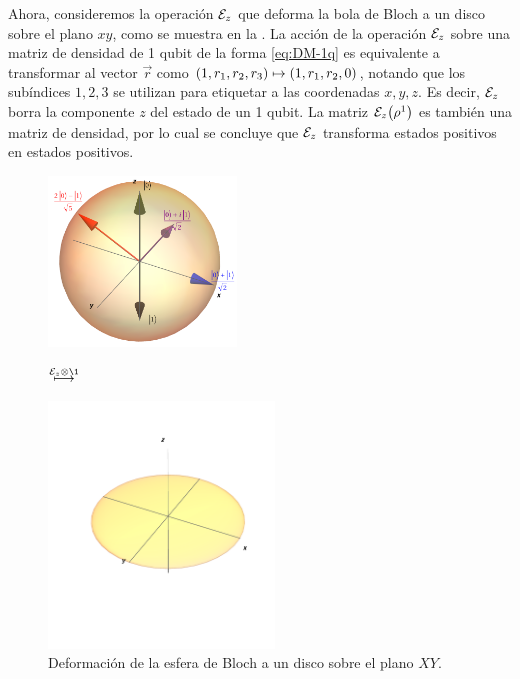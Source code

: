 Ahora, consideremos la operación $\mathcal{E}_z$ que deforma la bola de Bloch a un 
disco sobre el plano $xy$, como se muestra en la . 
La acción de la operación $\mathcal{E}_z$ sobre una matriz de densidad
de 1 qubit 
de la forma \eqref{eq:DM-1q} es equivalente a 
transformar al vector $\vec{r}$ como 
$\qty(1,r_1,r_2,r_3)\mapsto\qty(1,r_1,r_2,0)$,
notando que los subíndices $1,2,3$ se utilizan para
etiquetar a las coordenadas $x,y,z$. 
Es decir, $\mathcal{E}_z$ borra la componente $z$ del estado de un 1 qubit.
La matriz $\mathcal{E}_z\qty(\rho^1)$ es también una matriz de densidad, 
por lo cual se concluye que $\mathcal{E}_z$ transforma estados 
positivos en estados positivos.

\begin{figure}%
\centering
\begin{minipage}{.4\textwidth}
\centering
\includegraphics[width=5cm]
{img-congreso/bloch.png}
\end{minipage}
$\stackrel{\E_{z}\otimes\1 \vspace{1cm}}{\longmapsto}$
\begin{minipage}{0.4\textwidth}
\centering
\includegraphics[width=6cm]
{img-congreso/DiskXY}
\end{minipage}
\caption{
Deformación de la esfera de Bloch a un disco sobre el plano $XY$.}
\label{fig:qtm-op-motivation}
\end{figure} %

